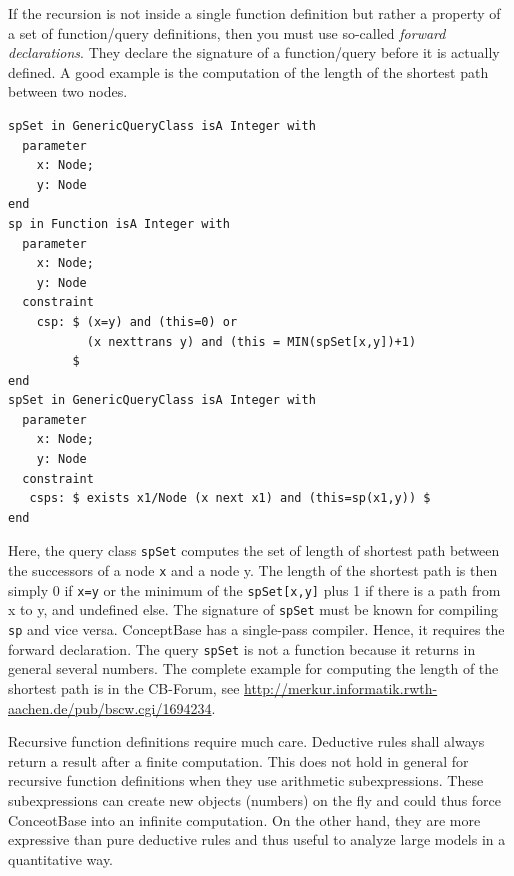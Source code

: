 If the recursion is not inside a single function definition but rather a property of a set
of function/query definitions, then you must use so-called {\em forward declarations}. They
declare the signature of a function/query before it is actually defined. A good example is
the computation of the length of the shortest path between two nodes.

{\small
\begin{verbatim}
spSet in GenericQueryClass isA Integer with
  parameter
    x: Node;
    y: Node
end
sp in Function isA Integer with
  parameter
    x: Node;
    y: Node
  constraint
    csp: $ (x=y) and (this=0) or
           (x nexttrans y) and (this = MIN(spSet[x,y])+1)
         $
end
spSet in GenericQueryClass isA Integer with
  parameter
    x: Node;
    y: Node
  constraint
   csps: $ exists x1/Node (x next x1) and (this=sp(x1,y)) $
end
\end{verbatim}
}

Here, the query class {\tt spSet} computes the set of length of shortest path between
the successors of a node {\tt x} and a node {y}. The length of the shortest path is then
simply 0 if {\tt x=y} or the minimum of the {\tt spSet[x,y]} plus 1 if there is a path from
x to y, and undefined else.
The signature of {\tt spSet} must be known for compiling {\tt sp} and vice versa. ConceptBase
has a single-pass compiler. Hence, it requires the forward declaration. The query
{\tt spSet} is not a function because it returns in general several numbers.
The complete example for computing the length of the shortest path is in the
CB-Forum, see \url{http://merkur.informatik.rwth-aachen.de/pub/bscw.cgi/1694234}.

Recursive function definitions require much care. Deductive rules shall always return
a result after a finite computation. This does not hold in general for recursive
function definitions when they use arithmetic subexpressions. These subexpressions
can create new objects (numbers) on the fly and could thus force ConceotBase into an
infinite computation. On the other hand, they are more expressive than pure
deductive rules and thus useful to analyze large models in a quantitative way.


